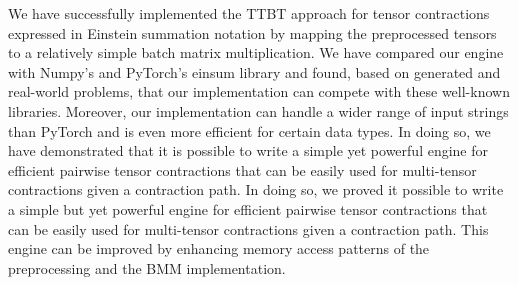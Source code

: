 We have successfully implemented the TTBT approach for tensor contractions expressed in Einstein summation notation by mapping the preprocessed tensors to a relatively simple batch matrix multiplication. We have compared our engine with Numpy's \cite{Numpy} and PyTorch's \cite{PyTorch} einsum library and found, based on generated and real-world problems, that our implementation can compete with these well-known libraries. Moreover, our implementation can handle a wider range of input strings than PyTorch and is even more efficient for certain data types. In doing so, we have demonstrated that it is possible to write a simple yet powerful engine for efficient pairwise tensor contractions that can be easily used for multi-tensor contractions given a contraction path. In doing so, we proved it possible to write a simple but yet powerful engine for efficient pairwise tensor contractions that can be easily used for multi-tensor contractions given a contraction path. This engine can be improved by enhancing memory access patterns of the preprocessing and the BMM implementation.
